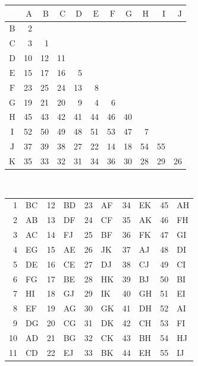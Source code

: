 \begin{tabular}{@{}c|rrrrrrrrrr@{}}
 & $\mathrm{A}$ & $\mathrm{B}$ & $\mathrm{C}$ & $\mathrm{D}$ & $\mathrm{E}$ & $\mathrm{F}$ & $\mathrm{G}$ & $\mathrm{H}$ & $\mathrm{I}$ & $\mathrm{J}$\\\hline
$\mathrm{B}$ & 2 &  &  &  &  &  &  &  &  & \\
$\mathrm{C}$ & 3 & 1 &  &  &  &  &  &  &  & \\
$\mathrm{D}$ & 10 & 12 & 11 &  &  &  &  &  &  & \\
$\mathrm{E}$ & 15 & 17 & 16 & 5 &  &  &  &  &  & \\
$\mathrm{F}$ & 23 & 25 & 24 & 13 & 8 &  &  &  &  & \\
$\mathrm{G}$ & 19 & 21 & 20 & 9 & 4 & 6 &  &  &  & \\
$\mathrm{H}$ & 45 & 43 & 42 & 41 & 44 & 46 & 40 &  &  & \\
$\mathrm{I}$ & 52 & 50 & 49 & 48 & 51 & 53 & 47 & 7 &  & \\
$\mathrm{J}$ & 37 & 39 & 38 & 27 & 22 & 14 & 18 & 54 & 55 & \\
$\mathrm{K}$ & 35 & 33 & 32 & 31 & 34 & 36 & 30 & 28 & 29 & 26\\
\end{tabular}\\[1.2em]
\begin{tabular}{@{}rlrlrlrlrl@{}}
1 & BC & 12 & BD & 23 & AF & 34 & EK & 45 & AH\\
2 & AB & 13 & DF & 24 & CF & 35 & AK & 46 & FH\\
3 & AC & 14 & FJ & 25 & BF & 36 & FK & 47 & GI\\
4 & EG & 15 & AE & 26 & JK & 37 & AJ & 48 & DI\\
5 & DE & 16 & CE & 27 & DJ & 38 & CJ & 49 & CI\\
6 & FG & 17 & BE & 28 & HK & 39 & BJ & 50 & BI\\
7 & HI & 18 & GJ & 29 & IK & 40 & GH & 51 & EI\\
8 & EF & 19 & AG & 30 & GK & 41 & DH & 52 & AI\\
9 & DG & 20 & CG & 31 & DK & 42 & CH & 53 & FI\\
10 & AD & 21 & BG & 32 & CK & 43 & BH & 54 & HJ\\
11 & CD & 22 & EJ & 33 & BK & 44 & EH & 55 & IJ\\
\end{tabular}
